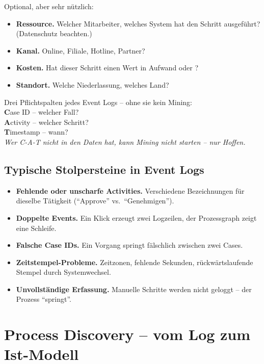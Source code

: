 \documentclass[11pt,a4paper,oneside]{article}
\newcommand{\caveatfontfallback}{\itshape}
\newcommand\caveatfont{\caveatfontfallback}%
\newcommand{\akzent}[1]{{\caveatfont\color{lpAmber}#1}}
\newcommand{\fachbegriff}[1]{\textbf{#1}}
\begin{document}
Optional, aber sehr nützlich:

\begin{itemize}
  \item \fachbegriff{Ressource.} Welcher Mitarbeiter, welches System hat den Schritt ausgeführt? (Datenschutz beachten.)
  \item \fachbegriff{Kanal.} Online, Filiale, Hotline, Partner?
  \item \fachbegriff{Kosten.} Hat dieser Schritt einen Wert in Aufwand oder \text{\euro}?
  \item \fachbegriff{Standort.} Welche Niederlassung, welches Land?
\end{itemize}

\begin{eselsbox}[Eselsbrücke: \akzent{C-A-T}]
Drei Pflichtspalten jedes Event Logs -- ohne sie kein Mining:\\[2pt]
\textbf{C}ase ID -- welcher Fall?\\
\textbf{A}ctivity -- welcher Schritt?\\
\textbf{T}imestamp -- wann?\\[2pt]
\emph{Wer C-A-T nicht in den Daten hat, kann Mining nicht starten -- nur Hoffen.}
\end{eselsbox}

\subsection{Typische Stolpersteine in Event Logs}

\begin{itemize}
  \item \fachbegriff{Fehlende oder unscharfe Activities.} Verschiedene Bezeichnungen für dieselbe Tätigkeit (``Approve'' vs.\ ``Genehmigen'').
  \item \fachbegriff{Doppelte Events.} Ein Klick erzeugt zwei Logzeilen, der Prozessgraph zeigt eine Schleife.
  \item \fachbegriff{Falsche Case IDs.} Ein Vorgang springt fälschlich zwischen zwei Cases.
  \item \fachbegriff{Zeitstempel-Probleme.} Zeitzonen, fehlende Sekunden, rückwärtslaufende Stempel durch Systemwechsel.
  \item \fachbegriff{Unvollständige Erfassung.} Manuelle Schritte werden nicht geloggt -- der Prozess ``springt''.
\end{itemize}

\section{Process Discovery -- vom Log zum Ist-Modell}
\end{document}
